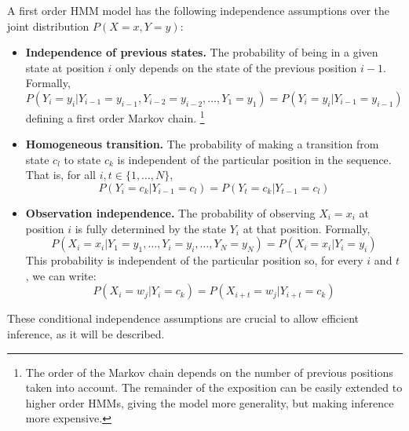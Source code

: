 A first order HMM model has the following independence assumptions over the joint distribution $P(X=x,Y=y)$:
\begin{itemize}
  \item \textbf{Independence of previous states.} The probability of
    being in a given state at position $i$ only depends on
    the state of the previous position $i-1$. Formally, 
    \begin{equation*}
    P (Y_i = y_i | Y_{i-1} = y_{i-1}, Y_{i-2} = y_{i-2}, \ldots, Y_1 = y_1) = P (Y_i = y_i | Y_{i-1} = y_{i-1})
    \end{equation*} 
    defining a first order Markov chain.%
    \footnote{The order of the Markov chain depends on the number of previous positions taken into account. 
    The remainder of the exposition can be easily extended to higher order HMMs, giving the model more generality, 
    but making inference more expensive.}
  \item \textbf{Homogeneous transition.} The probability of
    making a transition from state $c_l$ to state $c_k$ is independent of
    the particular position in the sequence. That is, for all $i,t \in \{1,\ldots,N\}$,
     \begin{equation*}
    P (Y_i = c_k | Y_{i-1} = c_l) =  P (Y_{t} = c_k | Y_{t-1} = c_l)
     \end{equation*}
  \item \textbf{Observation independence.}  The probability of
    observing $X_i = x_i$ at position $i$ is fully determined by the state $Y_i$
    at that position. Formally, 
     \begin{equation*}
     P (X_i = x_i | Y_1=y_1, \ldots, Y_i=y_i, \ldots, Y_N=y_N) = P(X_i = x_i | Y_i = y_i)
      \end{equation*}
      This probability is independent of the
    particular position so, for every $i$ and $t$, we can write:  
     \begin{equation*}
    P(X_i = w_j | Y_i = c_k) = P(X_{i+t} = w_j | Y_{i+t} = c_k)
     \end{equation*}
    
\end{itemize}
These conditional independence assumptions are crucial to allow
efficient inference, as it will be described.


